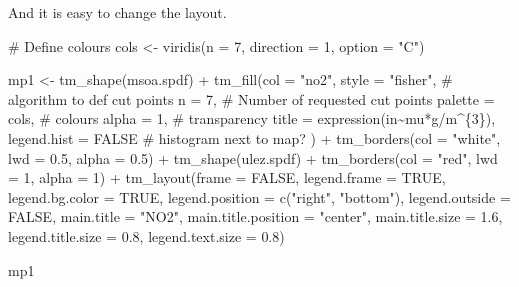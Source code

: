 \documentclass[
  letterpaper,
  DIV=11,
  numbers=noendperiod]{scrreprt}
\newenvironment{Shaded}{\begin{snugshade}}{\end{snugshade}}
\newcommand{\AttributeTok}[1]{\textcolor[rgb]{0.40,0.45,0.13}{#1}}
\newcommand{\CommentTok}[1]{\textcolor[rgb]{0.37,0.37,0.37}{#1}}
\newcommand{\ConstantTok}[1]{\textcolor[rgb]{0.56,0.35,0.01}{#1}}
\newcommand{\DecValTok}[1]{\textcolor[rgb]{0.68,0.00,0.00}{#1}}
\newcommand{\FloatTok}[1]{\textcolor[rgb]{0.68,0.00,0.00}{#1}}
\newcommand{\FunctionTok}[1]{\textcolor[rgb]{0.28,0.35,0.67}{#1}}
\newcommand{\NormalTok}[1]{\textcolor[rgb]{0.00,0.23,0.31}{#1}}
\newcommand{\OtherTok}[1]{\textcolor[rgb]{0.00,0.23,0.31}{#1}}
\newcommand{\SpecialCharTok}[1]{\textcolor[rgb]{0.37,0.37,0.37}{#1}}
\newcommand{\StringTok}[1]{\textcolor[rgb]{0.13,0.47,0.30}{#1}}
\begin{document}
And it is easy to change the layout.

\begin{Shaded}
\begin{Highlighting}[]
\CommentTok{\# Define colours}
\NormalTok{cols }\OtherTok{\textless{}{-}} \FunctionTok{viridis}\NormalTok{(}\AttributeTok{n =} \DecValTok{7}\NormalTok{, }\AttributeTok{direction =} \DecValTok{1}\NormalTok{, }\AttributeTok{option =} \StringTok{"C"}\NormalTok{)}

\NormalTok{mp1 }\OtherTok{\textless{}{-}}  \FunctionTok{tm\_shape}\NormalTok{(msoa.spdf) }\SpecialCharTok{+} 
  \FunctionTok{tm\_fill}\NormalTok{(}\AttributeTok{col =} \StringTok{"no2"}\NormalTok{, }
          \AttributeTok{style =} \StringTok{"fisher"}\NormalTok{, }\CommentTok{\# algorithm to def cut points}
          \AttributeTok{n =} \DecValTok{7}\NormalTok{, }\CommentTok{\# Number of requested cut points}
          \AttributeTok{palette =}\NormalTok{ cols, }\CommentTok{\# colours}
          \AttributeTok{alpha =} \DecValTok{1}\NormalTok{, }\CommentTok{\# transparency }
          \AttributeTok{title =} \FunctionTok{expression}\NormalTok{(}\StringTok{\textquotesingle{}in\textquotesingle{}}\SpecialCharTok{\textasciitilde{}}\NormalTok{mu}\SpecialCharTok{*}\StringTok{\textquotesingle{}g\textquotesingle{}}\SpecialCharTok{/}\NormalTok{m}\SpecialCharTok{\^{}}\NormalTok{\{}\DecValTok{3}\NormalTok{\}), }
          \AttributeTok{legend.hist =} \ConstantTok{FALSE} \CommentTok{\# histogram next to map?}
\NormalTok{          ) }\SpecialCharTok{+}
  \FunctionTok{tm\_borders}\NormalTok{(}\AttributeTok{col =} \StringTok{"white"}\NormalTok{, }\AttributeTok{lwd =} \FloatTok{0.5}\NormalTok{, }\AttributeTok{alpha =} \FloatTok{0.5}\NormalTok{) }\SpecialCharTok{+}
  \FunctionTok{tm\_shape}\NormalTok{(ulez.spdf) }\SpecialCharTok{+}
  \FunctionTok{tm\_borders}\NormalTok{(}\AttributeTok{col =} \StringTok{"red"}\NormalTok{, }\AttributeTok{lwd =} \DecValTok{1}\NormalTok{, }\AttributeTok{alpha =} \DecValTok{1}\NormalTok{) }\SpecialCharTok{+}
  \FunctionTok{tm\_layout}\NormalTok{(}\AttributeTok{frame =} \ConstantTok{FALSE}\NormalTok{,}
            \AttributeTok{legend.frame =} \ConstantTok{TRUE}\NormalTok{, }\AttributeTok{legend.bg.color =} \ConstantTok{TRUE}\NormalTok{,}
            \AttributeTok{legend.position =} \FunctionTok{c}\NormalTok{(}\StringTok{"right"}\NormalTok{, }\StringTok{"bottom"}\NormalTok{),}
            \AttributeTok{legend.outside =} \ConstantTok{FALSE}\NormalTok{,}
            \AttributeTok{main.title =} \StringTok{"NO2"}\NormalTok{, }
            \AttributeTok{main.title.position =} \StringTok{"center"}\NormalTok{,}
            \AttributeTok{main.title.size =} \FloatTok{1.6}\NormalTok{,}
            \AttributeTok{legend.title.size =} \FloatTok{0.8}\NormalTok{,}
            \AttributeTok{legend.text.size =} \FloatTok{0.8}\NormalTok{)}

\NormalTok{mp1}
\end{Highlighting}
\end{Shaded}
\end{document}
